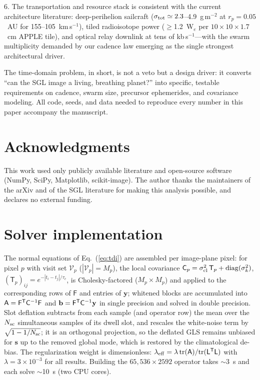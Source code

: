 ﻿\documentclass[twocolumn,10pt]{article}
\newcommand{\acknowledgments}{\section*{Acknowledgments}}
\begin{document}
6. The transportation and resource stack is consistent with the
current architecture literature: deep-perihelion sailcraft
($\sigma_{\rm tot}\simeq2.3$--4.9~g\,m$^{-2}$ at $r_p=0.05$~AU for
155--105~km\,s$^{-1}$), tiled radioisotope power ($\ge$1.2~W$_e$ per
$10\times10\times1.7$~cm APPLE tile), and optical relay downlink at
tens of kb\,s$^{-1}$---with the swarm multiplicity demanded by our
cadence law emerging as the single strongest architectural driver.

The time-domain problem, in short, is not a veto but a design driver:
it converts ``can the SGL image a living, breathing planet?'' into
specific, testable requirements on cadence, swarm size, precursor
ephemerides, and covariance modeling. All code, seeds, and data needed
to reproduce every number in this paper accompany the manuscript.

\acknowledgments
This work used only publicly available literature and open-source
software (NumPy, SciPy, Matplotlib, scikit-image). The author thanks
the maintainers of the arXiv and of the SGL literature for making this
analysis possible, and declares no external funding.

\appendix

\section{Solver implementation}
\label{app:solver}
The normal equations of Eq.~(\ref{eq:tdi}) are assembled per
image-plane pixel: for pixel $p$ with visit set $\mathcal{V}_p$
($|\mathcal{V}_p|=M_p$), the local covariance
$\mathsf{C}_p=\sigma_{\rm cl}^2\,\mathsf{T}_p+
\mathrm{diag}(\sigma_k^2)$,
$(\mathsf{T}_p)_{ij}=e^{-|t_i-t_j|/\tau_c}$, is Cholesky-factored
($M_p\times M_p$) and applied to the corresponding rows of
$\mathsf{F}$ and entries of $\mathbf{y}$; whitened blocks are
accumulated into
$\mathsf{A}=\mathsf{F}^{\sf T}\mathsf{C}^{-1}\mathsf{F}$ and
$\mathbf{b}=\mathsf{F}^{\sf T}\mathsf{C}^{-1}\mathbf{y}$ in single
precision and solved in double precision. Slot deflation subtracts from
each sample (and operator row) the mean over the $N_{\rm sc}$
simultaneous samples of its dwell slot, and rescales the white-noise
term by $\sqrt{1-1/N_{\rm sc}}$; it is an orthogonal projection, so the
deflated GLS remains unbiased for $\mathbf{s}$ up to the removed global
mode, which is restored by the climatological de-bias. The
regularization weight is dimensionless:
$\lambda_{\rm eff}=\lambda\,\mathrm{tr}(\mathsf{A})/
\mathrm{tr}(\mathsf{L}^{\sf T}\mathsf{L})$ with $\lambda=3\times10^{-3}$
for all results. Building the $65{,}536\times2592$ operator takes
$\sim$3~s and each solve $\sim$10~s (two CPU cores).
\end{document}
